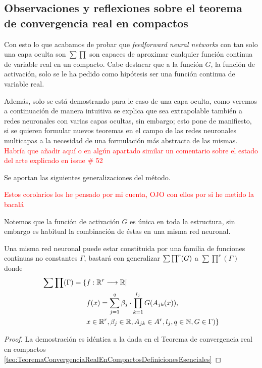 \subsection{Observaciones y reflexiones sobre el teorema de convergencia real en compactos}

Con esto lo que acabamos de probar que \textit{feedforward neural networks} con tan solo una capa oculta son $\sum \prod$ son capaces de aproximar cualquier 
función continua de variable real en un compacto.  Cabe destacar que a la función $G$, la función de activación,
 solo se le ha pedido como 
hipótesis ser una función continua de variable real.     

Además, solo se está demostrando para le caso de una capa oculta, como veremos a continuación  de 
manera intuitiva se explica que sea extrapolable también a redes neuronales 
con varias capas ocultas, sin embargo; esto pone de manifiesto, si se quieren formular nuevos teoremas en el campo de las redes neuronales
multicapas a la necesidad de una formulación más abstracta de las mismas. 
\textcolor{red}{Habría que añadir aquí o en algún apartado similar un comentario
sobre el estado del arte explicado en issue \# 52 }

Se aportan las siguientes generalizaciones del método. 

\textcolor{red}{Estos corolarios los he pensado por mi cuenta, OJO con ellos por si he metido la bacalá}

Notemos que la función de activación $G$ es única en toda la estructura,
sin embargo es habitual la combinación de éstas en una misma red neuronal. 

\begin{corolario}

    Una misma red neuronal puede estar constituida por una familia de funciones continuas no constantes $\Gamma$, 
    bastará con generalizar $\sum \prod^r (G)$ a $\sum \prod ^r (\Gamma)$ donde 
    \begin{equation}
        \begin{split}
            \sum \prod (\Gamma) = \{ 
                &f: \mathbb{R}^r \longrightarrow \mathbb{R} | \\
                & f(x) = \sum_{j = 1} ^q  \beta_j \cdot \prod_{k=1}^{l_j}
                G(A_{jk}(x)), \\
                &x  \in \mathbb{R}^r, \beta_j \in \mathbb{R}, A_{jk}\in A^r, l_j,q \in \mathbb{N}, G \in \Gamma
                )
                \}
        \end{split}
    \end{equation}
\end{corolario}
\begin{proof}
    La demostración es idéntica a la dada en el Teorema de convergencia 
    real en compactos \ref{teo:TeoremaConvergenciaRealEnCompactosDefinicionesEsenciales}
\end{proof}

